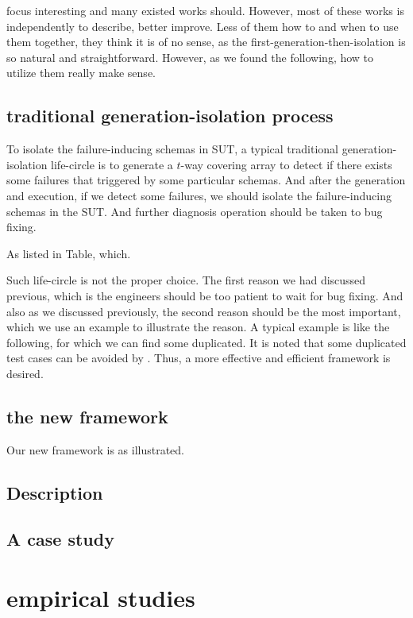 \documentclass{sig-alternate}
\begin{document}
focus interesting and many existed works should. However, most of these works is independently to describe, better improve. Less of them how to and when to use them together, they think it is of no sense, as the first-generation-then-isolation is so natural and straightforward.  However, as we found the following, how to utilize them really make sense.

\subsection{traditional generation-isolation process}
To isolate the failure-inducing schemas in SUT, a typical traditional generation-isolation life-circle is to generate a $t$-way covering array to detect if there exists some failures that triggered by some particular schemas. And after the generation and execution, if we detect some failures, we should isolate the failure-inducing schemas in the SUT. And further diagnosis operation should be taken to bug fixing. 

As listed in Table, which. 

Such life-circle is not the proper choice. The first reason we had discussed previous, which is the engineers should be too patient to wait for bug fixing. And also as we discussed previously, the second reason should be the most important, which we use an example to illustrate the reason. A typical example is like the following,
for which we can find some duplicated. It is noted that some duplicated test cases can be avoided by . Thus, a more effective and efficient framework is desired.

\subsection{the new framework}
Our new framework is as illustrated.


\subsection{Description}


\subsection{A case study}

\section{empirical studies}
\end{document}
